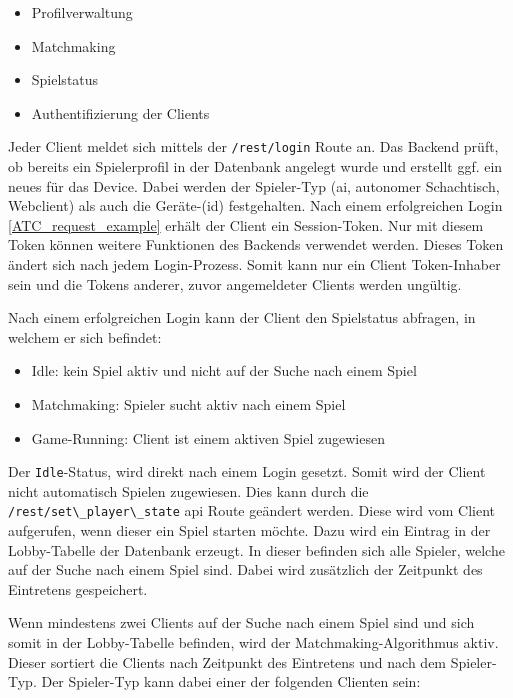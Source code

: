 \begin{itemize}
\tightlist
\item
  Profilverwaltung
\item
  Matchmaking
\item
  Spielstatus
\item
  Authentifizierung der Clients
\end{itemize}

Jeder Client meldet sich mittels der
\passthrough{\lstinline!/rest/login!} Route an. Das Backend prüft, ob
bereits ein Spielerprofil in der Datenbank angelegt wurde und erstellt
ggf. ein neues für das Device. Dabei werden der Spieler-Typ (\gls{ai},
autonomer Schachtisch, Webclient) als auch die Geräte-(id) festgehalten.
Nach einem erfolgreichen Login \ref{ATC_request_example} erhält der
Client ein Session-Token. Nur mit diesem Token können weitere Funktionen
des Backends verwendet werden. Dieses Token ändert sich nach jedem
Login-Prozess. Somit kann nur ein Client Token-Inhaber sein und die
Tokens anderer, zuvor angemeldeter Clients werden ungültig.

Nach einem erfolgreichen Login kann der Client den Spielstatus abfragen,
in welchem er sich befindet:

\begin{itemize}
\tightlist
\item
  Idle: kein Spiel aktiv und nicht auf der Suche nach einem Spiel
\item
  Matchmaking: Spieler sucht aktiv nach einem Spiel
\item
  Game-Running: Client ist einem aktiven Spiel zugewiesen
\end{itemize}

Der \passthrough{\lstinline!Idle!}-Status, wird direkt nach einem Login
gesetzt. Somit wird der Client nicht automatisch Spielen zugewiesen.
Dies kann durch die \passthrough{\lstinline!/rest/set\_player\_state!}
\gls{api} Route geändert werden. Diese wird vom Client aufgerufen, wenn
dieser ein Spiel starten möchte. Dazu wird ein Eintrag in der
Lobby-Tabelle der Datenbank erzeugt. In dieser befinden sich alle
Spieler, welche auf der Suche nach einem Spiel sind. Dabei wird
zusätzlich der Zeitpunkt des Eintretens gespeichert.

Wenn mindestens zwei Clients auf der Suche nach einem Spiel sind und
sich somit in der Lobby-Tabelle befinden, wird der
Matchmaking-Algorithmus aktiv. Dieser sortiert die Clients nach
Zeitpunkt des Eintretens und nach dem Spieler-Typ. Der Spieler-Typ kann
dabei einer der folgenden Clienten sein:

